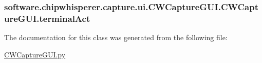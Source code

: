 \subsubsection[{terminal\+Act}]{\setlength{\rightskip}{0pt plus 5cm}software.\+chipwhisperer.\+capture.\+ui.\+C\+W\+Capture\+G\+U\+I.\+C\+W\+Capture\+G\+U\+I.\+terminal\+Act}\label{classsoftware_1_1chipwhisperer_1_1capture_1_1ui_1_1CWCaptureGUI_1_1CWCaptureGUI_a2d12aac5c9090aa205cbc09ad56164d6}


The documentation for this class was generated from the following file\+:\begin{DoxyCompactItemize}
\item 
\hyperlink{CWCaptureGUI_8py}{C\+W\+Capture\+G\+U\+I.\+py}\end{DoxyCompactItemize}
